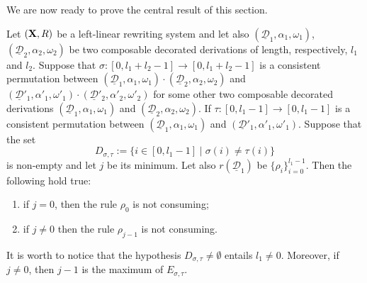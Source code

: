 \documentclass[a4paper,UKenglish,cleveref,pdftex,thm-restate,numberwithinsect]{lipics-v2021}
\def\X{\textbf {\textup{X}}}
\newcommand{\dder}[1]{\mathscr{#1}}
\newcommand{\der}[1]{\underline{\dder{#1}}}
\begin{document}
We are now ready to prove the central result of this section.
\begin{lemma}\label{lem:impo}
  Let $(\X,R)$ be a left-linear rewriting system and let also
  $(\der{D}_1, \alpha_1, \omega_1)$, $(\der{D}_2, \alpha_2, \omega_2)$
  be two composable decorated derivations of length, respectively,
  $l_1$ and $l_2$. Suppose that
  $\sigma:[0, l_1+l_2-1]\to [0, l_1+l_2-1]$ is a consistent
  permutation between
  $(\der{D}_1, \alpha_1, \omega_1)\cdot (\der{D}_2, \alpha_2,
  \omega_2)$ and
  $(\der{D}'_1, \alpha'_1, \omega'_1)\cdot (\der{D}'_2, \alpha'_2,
  \omega'_2)$ for some other two composable decorated derivations
  $(\der{D}_1, \alpha_1, \omega_1)$ and
  $(\der{D}_2, \alpha_2, \omega_2)$.  If
  $\tau:[0,l_1-1]\to [0, l_1-1]$ is a consistent permutation between
  $(\der{D}_1, \alpha_1, \omega_1)$ and
  $(\der{D}'_1, \alpha'_1, \omega'_1)$. Suppose that the set
  \[D_{\sigma, \tau}:=\{i\in [0, l_1-1]\mid \sigma(i)\neq \tau(i)\}\]
  is non-empty and let $j$ be its minimum. Let also $r(\der{D}_1)$ be $\{\rho_i\}_{i=0}^{l_1-1}$. Then the following hold true:
  \begin{enumerate}
  \item if $j=0$, then the rule $\rho_0$ is not consuming;
  \item if $j\neq 0$ then the rule $\rho_{j-1}$ is not consuming.
  \end{enumerate}
\end{lemma}
\begin{remark}\label{rem:minmax}It is worth to notice that the hypothesis $D_{\sigma, \tau} \neq \emptyset$ entails $l_1\neq 0$. Moreover, if $j\neq 0$, then $j-1$ is the maximum of $E_{\sigma, \tau}$.
\end{remark}
\end{document}
